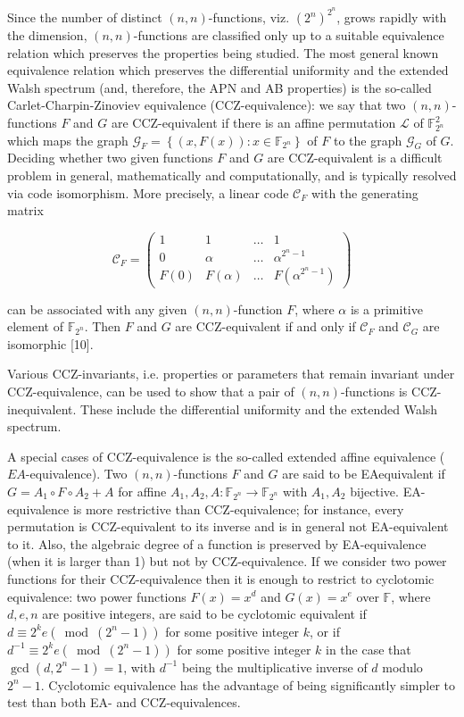 \documentclass[10pt]{article}
\begin{document}
Since the number of distinct $(n, n)$-functions, viz. $\left(2^{n}\right)^{2^{n}}$, grows rapidly with the dimension, $(n, n)$-functions are classified only up to a suitable equivalence relation which preserves the properties being studied. The most general known equivalence relation which preserves the differential uniformity and the extended Walsh spectrum (and, therefore, the APN and AB properties) is the so-called Carlet-Charpin-Zinoviev equivalence (CCZ-equivalence): we say that two $(n, n)$-functions $F$ and $G$ are CCZ-equivalent if there is an affine permutation $\mathcal{L}$ of $\mathbb{F}_{2^{n}}^{2}$ which maps the graph $\mathcal{G}_{F}=\left\{(x, F(x)): x \in \mathbb{F}_{2^{n}}\right\}$ of $F$ to the graph $\mathcal{G}_{G}$ of $G$. Deciding whether two given functions $F$ and $G$ are CCZ-equivalent is a difficult problem in general, mathematically and computationally, and is typically resolved via code isomorphism. More precisely, a linear code $\mathcal{C}_{F}$ with the generating matrix

$$
\mathcal{C}_{F}=\left(\begin{array}{cccc}
1 & 1 & \ldots & 1 \\
0 & \alpha & \ldots & \alpha^{2^{n}-1} \\
F(0) & F(\alpha) & \ldots & F\left(\alpha^{2^{n}-1}\right)
\end{array}\right)
$$

can be associated with any given $(n, n)$-function $F$, where $\alpha$ is a primitive element of $\mathbb{F}_{2^{n}}$. Then $F$ and $G$ are CCZ-equivalent if and only if $\mathcal{C}_{F}$ and $\mathcal{C}_{G}$ are isomorphic [10].

Various CCZ-invariants, i.e. properties or parameters that remain invariant under CCZ-equivalence, can be used to show that a pair of $(n, n)$-functions is CCZ-inequivalent. These include the differential uniformity and the extended Walsh spectrum.

A special cases of CCZ-equivalence is the so-called extended affine equivalence ( $E A$-equivalence). Two $(n, n)$-functions $F$ and $G$ are said to be EAequivalent if $G=A_{1} \circ F \circ A_{2}+A$ for affine $A_{1}, A_{2}, A: \mathbb{F}_{2^{n}} \rightarrow \mathbb{F}_{2^{n}}$ with $A_{1}, A_{2}$ bijective. EA-equivalence is more restrictive than CCZ-equivalence; for instance, every permutation is CCZ-equivalent to its inverse and is in general not EA-equivalent to it. Also, the algebraic degree of a function is preserved by EA-equivalence (when it is larger than 1) but not by CCZ-equivalence. If we consider two power functions for their CCZ-equivalence then it is enough to restrict to cyclotomic equivalence: two power functions $F(x)=x^{d}$ and $G(x)=x^{e}$ over $\mathbb{F}$, where $d, e, n$ are positive integers, are said to be cyclotomic equivalent if $d \equiv 2^{k} e\left(\bmod \left(2^{n}-1\right)\right)$ for some positive integer $k$, or if $d^{-1} \equiv 2^{k} e \left(\bmod \left(2^{n}-1\right)\right)$ for some positive integer $k$ in the case that $\operatorname{gcd}\left(d, 2^{n}-1\right)=1$, with $d^{-1}$ being the multiplicative inverse of $d$ modulo $2^{n}-1$. Cyclotomic equivalence has the advantage of being significantly simpler to test than both EA- and CCZ-equivalences.
\end{document}
